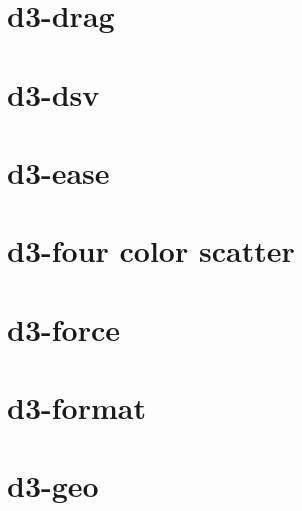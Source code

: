\documentclass[twoside]{book}
\newcommand{\+}{\discretionary{\mbox{\scriptsize$\hookleftarrow$}}{}{}}
\begin{document}
\chapter{d3-\/drag}
\label{md_dsmacc_examples_DRmerge_node_modules_d3-drag_README}

\chapter{d3-\/dsv}
\label{md_dsmacc_examples_DRmerge_node_modules_d3-dsv_README}

\chapter{d3-\/ease}
\label{md_dsmacc_examples_DRmerge_node_modules_d3-ease_README}

\chapter{d3-\/four color scatter}
\label{md_dsmacc_examples_DRmerge_node_modules_d3-fcs_README}

\chapter{d3-\/force}
\label{md_dsmacc_examples_DRmerge_node_modules_d3-force_README}

\chapter{d3-\/format}
\label{md_dsmacc_examples_DRmerge_node_modules_d3-format_README}

\chapter{d3-\/geo}
\label{md_dsmacc_examples_DRmerge_node_modules_d3-geo_README}

\end{document}
